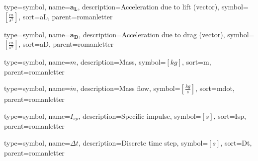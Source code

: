 {
type=symbol, %
name={\ensuremath{\mathbf{a_L}}}, %
description={Acceleration due to lift (vector)}, %
symbol={$\left[\frac{m}{s^2}\right]$}, %
sort=aL, %
parent=romanletter %
}

{
type=symbol, %
name={\ensuremath{\mathbf{a_D}}}, %
description={Acceleration due to drag (vector)}, %
symbol={$\left[\frac{m}{s^2}\right]$}, %
sort=aD, %
parent=romanletter %
}

{
type=symbol, %
name={\ensuremath{m}}, %
description={Mass}, %
symbol={$\left[kg\right]$}, %
sort=m, %
parent=romanletter %
}

{
type=symbol, %
name={\ensuremath{\dot{m}}}, %
description={Mass flow}, %
symbol={$\left[\frac{kg}{s}\right]$}, %
sort=mdot, %
parent=romanletter %
}

{
type=symbol, %
name={\ensuremath{I_{sp}}}, %
description={Specific impulse}, %
symbol={$\left[s\right]$}, %
sort=Isp, %
parent=romanletter %
}

{
type=symbol, %
name={\ensuremath{\Delta t}}, %
description={Discrete time step}, %
symbol={$\left[s\right]$}, %
sort=Dt, %
parent=romanletter %
}

